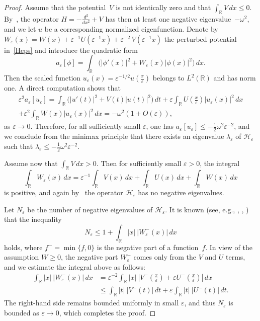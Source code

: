 \documentclass[reqno]{amsart}
\theoremstyle{definition}
\theoremstyle{remark}
\numberwithin{equation}{section}
\newcommand{\Real}{\mathbb R}
\newcommand{\eps}{\varepsilon}
\newcommand{\cH}{\mathcal{H}}
\newcommand\xe{\left(\tfrac x\eps\right)}
\begin{document}
\begin{proof}
Assume that the potential~$V$ is not identically zero and that $\int_{\Real}V\,dx\le 0$. By~\cite[Th.XIII.110]{ReedSimonIV}, the operator $H=-\frac{d^2}{dx^2}+V$ has then at least one negative eigenvalue~$-\omega^2$, and we let $u$ be a corresponding normalized eigenfunction. Denote by $W_\eps(x)=W(x) + \eps^{-1} U(\eps^{-1}x)+\eps^{-2}\,V(\eps^{-1}x)$ the perturbed potential in~\eqref{Heps} and introduce the quadratic form
  \begin{equation*}
    a_\eps[\phi]=\int_\Real\bigl(|\phi'(x)|^2+W_\eps(x)|\phi(x)|^2\bigr)\,dx.
  \end{equation*}
Then the scaled function $u_\eps(x)=\eps^{-1/2}u\xe$ belongs to $L^2(\Real)$ and has norm one. A direct computation shows that
\begin{multline*}
    \eps^{2}a_\eps[u_\eps]=\int_\Real\bigl(|u'(t)|^2+V(t)|u(t)|^2\bigr)\,dt+\eps
    \int_\Real U\xe|u_\eps(x)|^2\,dx\\+\eps^{2}\int_\Real W(x)|u_\eps(x)|^2\,dx=-\omega^2(1+O(\eps)),
\end{multline*}
as $\eps\to 0$. Therefore, for all sufficiently small $\eps$, one has $a_\eps[u_\eps]\le-\frac12 \omega^2\eps^{-2}$, and we conclude from the minimax principle that there exists an eigenvalue $\lambda_\eps$ of $\cH_\eps$ such that $\lambda_\eps\le -\frac12 \omega^2 \eps^{-2}$.

Assume now that $\int_{\Real}V\,dx>0$. Then for sufficiently small $\eps>0$, the integral
\begin{equation*}
  \int_{\Real}W_\eps(x)\,dx=\eps^{-1}\int_{\Real}V(x)\,dx+\int_{\Real}U(x)\,dx+\int_{\Real}W(x)\,dx
\end{equation*}
is positive, and again by~\cite[Th.~XIII.110]{ReedSimonIV} the operator $\cH_\eps$ has no negative eigenvalues.

Let $N_\eps$ be the number of negative eigenvalues of $\cH_\eps$. It is known (see, e.g., \cite[Th.~5.3]{BerezinShubin1991}, \cite[Th.~7.5]{Simon2005}, \cite{Klaus1977, Klaus1982}) that the inequality
\begin{equation*}
  N_\eps\le 1+\int_{\Real}|x|\:|W^-_\eps(x)|\,dx
\end{equation*}
holds, where $f^-=\min\{f,0\}$ is the negative part of a function~$f$.
In view of the assumption $W \ge 0$, the negative part $W^-_\eps$ comes only from the $V$ and $U$ terms, and we estimate the integral above as follows:
\begin{align*}
  \int_{\Real}|x|\:|W^-_\eps(x)|\,dx&=\eps^{-2}\int_{\Real}|x|\:|V^-\xe+\eps U^-\xe|\,dx \\ &\le\int_{\Real}|t|\:|V^-(t)|\,dt+\eps\int_{\Real}|t|\:|U^-(t)|\,dt.
\end{align*}
The right-hand side remains bounded uniformly in small $\eps$, and thus $N_\eps$ is bounded as $\eps \to 0$, which completes the proof.
\end{proof}
\end{document}
